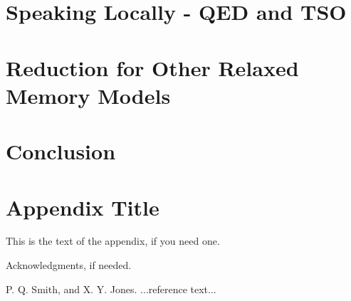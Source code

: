 \documentclass[preprint,9pt]{sigplanconf}
\begin{document}
\section{Speaking Locally - QED and TSO}

\section{Reduction for Other Relaxed Memory Models}

\section{Conclusion}


\appendix
\section{Appendix Title}

This is the text of the appendix, if you need one.

\acks

Acknowledgments, if needed.





\begin{thebibliography}{}
\softraggedright

P. Q. Smith, and X. Y. Jones. ...reference text...

\end{thebibliography}
\end{document}
